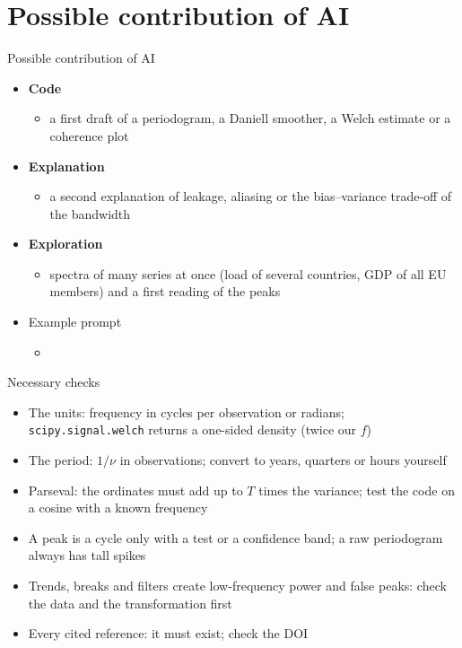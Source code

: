 \section{Possible contribution of AI}

\begin{frame}{Possible contribution of AI}
\itemsize{\small}
\begin{itemize}
    \item \textbf{Code}
    \begin{itemize}
        \item a first draft of a periodogram, a Daniell smoother, a Welch estimate or a coherence plot
    \end{itemize}
    \item \textbf{Explanation}
    \begin{itemize}
        \item a second explanation of leakage, aliasing or the bias--variance trade-off of the bandwidth
    \end{itemize}
    \item \textbf{Exploration}
    \begin{itemize}
        \item spectra of many series at once (load of several countries, GDP of all EU members) and a first reading of the peaks
    \end{itemize}
    \item Example prompt
    \begin{itemize}
        \item {}
    \end{itemize}
\end{itemize}
\end{frame}

\begin{frame}{Necessary checks}
\itemsize{\small}
\begin{itemize}
    \item The units: frequency in cycles per observation or radians; \texttt{scipy.signal.welch} returns a one-sided density (twice our $f$)
    \item The period: $1/\nu$ in observations; convert to years, quarters or hours yourself
    \item Parseval: the ordinates must add up to $T$ times the variance; test the code on a cosine with a known frequency
    \item A peak is a cycle only with a test or a confidence band; a raw periodogram always has tall spikes
    \item Trends, breaks and filters create low-frequency power and false peaks: check the data and the transformation first
    \item Every cited reference: it must exist; check the DOI
\end{itemize}
\end{frame}


